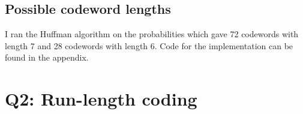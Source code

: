 \documentclass{article}
\begin{document}
\subsection{Possible codeword lengths}
I ran the Huffman algorithm on the probabilities which gave
72 codewords with length 7 
and 28 codewords with length 6.
Code for the implementation can be found in the appendix.

\section{Q2: Run-length coding}
\end{document}
